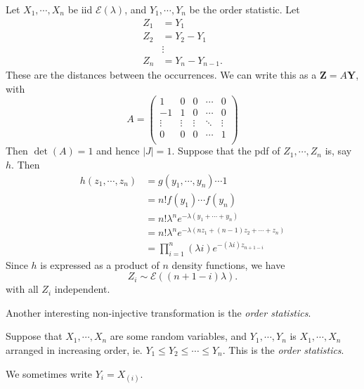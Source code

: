\documentclass[a4paper]{article}
\begin{document}
\begin{eg}
  Let $X_1, \cdots, X_n$ be iid $\mathcal{E}(\lambda)$, and $Y_1, \cdots, Y_n$ be the order statistic. Let
  \begin{align*}
    Z_1 &= Y_1\\
    Z_2 &= Y_2 - Y_1\\
    &\vdots\\
    Z_n &= Y_n - Y_{n - 1}.
  \end{align*}
  These are the distances between the occurrences. We can write this as a $\mathbf{Z} = A\mathbf{Y}$, with
  \[
    A =
    \begin{pmatrix}
      1 & 0 & 0 & \cdots&  0\\
      -1 & 1 & 0 & \cdots & 0\\
      \vdots & \vdots & \vdots & \ddots & \vdots\\
      0 & 0 & 0 & \cdots & 1\\
    \end{pmatrix}
  \]
  Then $\det (A) = 1$ and hence $|J| = 1$. Suppose that the pdf of $Z_1, \cdots, Z_n$ is, say $h$. Then
  \begin{align*}
    h(z_1, \cdots, z_n) &= g(y_1, \cdots, y_n)\cdots 1\\
    &= n!f(y_1) \cdots f(y_n)\\
    &= n!\lambda^n e^{-\lambda (y_1 + \cdots + y_n)}\\
    &= n!\lambda^n e^{-\lambda (nz_1 + (n - 1)z_2 + \cdots + z_n)}\\
    &= \prod_{i = 1}^n (\lambda i)e^{-(\lambda i)z_{n + 1 - i}}
  \end{align*}
  Since $h$ is expressed as a product of $n$ density functions, we have
  \[
    Z_i \sim \mathcal{E}((n + 1 - i)\lambda).
  \]
  with all $Z_i$ independent.
\end{eg}

Another interesting non-injective transformation is the \emph{order statistics}.
\begin{defi}
  Suppose that $X_1, \cdots, X_n$ are some random variables, and $Y_1, \cdots, Y_n$ is $X_1, \cdots, X_n$ arranged in increasing order, ie. $Y_1 \leq Y_2 \leq \cdots \leq Y_n$. This is the \emph{order statistics}.

  We sometimes write $Y_i = X_{(i)}$.
\end{defi}
\end{document}
